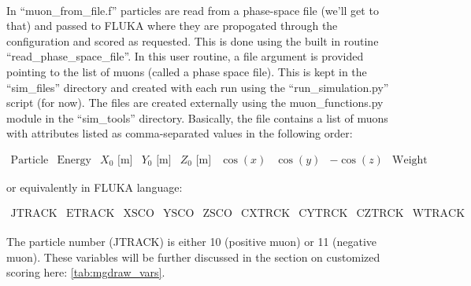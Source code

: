 \paragraph{}
In ``muon\_from\_file.f'' particles are read from a phase-space file (we'll get to that) and passed to FLUKA where they are propogated through the configuration and scored as requested. This is done using the built in routine ``read\_phase\_space\_file''. In this user routine, a file argument is provided pointing to the list of muons (called a phase space file). This is kept in the ``sim\_files'' directory and created with each run using the ``run\_simulation.py'' script (for now). The files are created externally using the muon\_functions.py module in the ``sim\_tools'' directory. Basically, the file contains a list of muons with attributes listed as comma-separated values in the following order:

\[
    \begin{matrix}
        \text{Particle No.} & \text{Energy  [GeV]} & X_0 \text{ [m]} & Y_0 \text{ [m]}& Z_0 \text{ [m]}& \cos(x) & \cos(y) & -\cos(z) & \text{Weight}
    \end{matrix}
\]

or equivalently in FLUKA language:

\[
    \begin{matrix}
        \text{JTRACK} & \text{ETRACK} & \text{XSCO} & \text{YSCO} & \text{ZSCO} & \text{CXTRCK} & \text{CYTRCK} & \text{CZTRCK} & \text{WTRACK}
    \end{matrix}
\]

\paragraph{}
The particle number (JTRACK) is either 10 (positive muon) or 11 (negative muon). These variables will be further discussed in the section on customized scoring here: \ref{tab:mgdraw_vars}. 

